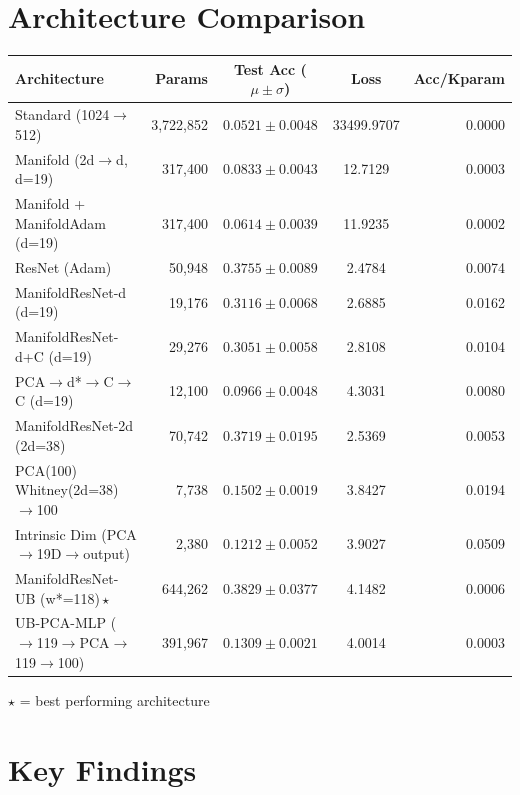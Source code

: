 \documentclass[11pt,letterpaper]{article}
\begin{document}
\section{Architecture Comparison}

{\small
\begin{tabular}{@{}p{7cm}rccr@{}}
\toprule
\textbf{Architecture} & \textbf{Params} & \textbf{Test Acc ($\mu \pm \sigma$)} & \textbf{Loss} & \textbf{Acc/Kparam} \\
\midrule
  {Standard (1024$\rightarrow$512)} & 3,722,852 & $0.0521 \pm 0.0048$ & 33499.9707 & 0.0000 \\
  {Manifold (2d$\rightarrow$d, d=19)} & 317,400 & $0.0833 \pm 0.0043$ & 12.7129 & 0.0003 \\
  {Manifold + ManifoldAdam (d=19)} & 317,400 & $0.0614 \pm 0.0039$ & 11.9235 & 0.0002 \\
  {ResNet (Adam)} & 50,948 & $0.3755 \pm 0.0089$ & 2.4784 & 0.0074 \\
  {ManifoldResNet-d (d=19)} & 19,176 & $0.3116 \pm 0.0068$ & 2.6885 & 0.0162 \\
  {ManifoldResNet-d+C (d=19)} & 29,276 & $0.3051 \pm 0.0058$ & 2.8108 & 0.0104 \\
  {PCA$\rightarrow$d*$\rightarrow$C$\rightarrow$C (d=19)} & 12,100 & $0.0966 \pm 0.0048$ & 4.3031 & 0.0080 \\
  {ManifoldResNet-2d (2d=38)} & 70,742 & $0.3719 \pm 0.0195$ & 2.5369 & 0.0053 \\
  {PCA(100) Whitney(2d=38)$\rightarrow$100} & 7,738 & $0.1502 \pm 0.0019$ & 3.8427 & 0.0194 \\
  {Intrinsic Dim (PCA$\rightarrow$19D$\rightarrow$output)} & 2,380 & $0.1212 \pm 0.0052$ & 3.9027 & 0.0509 \\
  {\color{wincolor}ManifoldResNet-UB (w*=118)\,$\star$} & 644,262 & $0.3829 \pm 0.0377$ & 4.1482 & 0.0006 \\
  {UB-PCA-MLP ($\rightarrow$119$\rightarrow$PCA$\rightarrow$119$\rightarrow$100)} & 391,967 & $0.1309 \pm 0.0021$ & 4.0014 & 0.0003 \\
\bottomrule
\end{tabular}
}

\smallskip
{\small $\star$ = best performing architecture}

\section{Key Findings}
\end{document}
